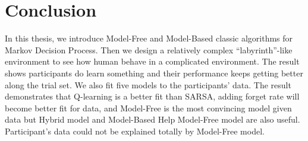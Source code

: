 \section{Conclusion}
In this thesis, we introduce Model-Free and Model-Based classic algorithms for Markov Decision Process. Then we design a relatively complex \enquote{labyrinth}-like environment to see how human behave in a complicated environment. The result shows participants do learn something and their performance keeps getting better along the trial set. We also fit five models to the participants' data. The result demonstrates that Q-learning is a better fit than SARSA, adding forget rate will become better fit for data, and Model-Free is the most convincing model given data but Hybrid model and Model-Based Help Model-Free model are also useful. Participant's data could not be explained totally by Model-Free model. 



